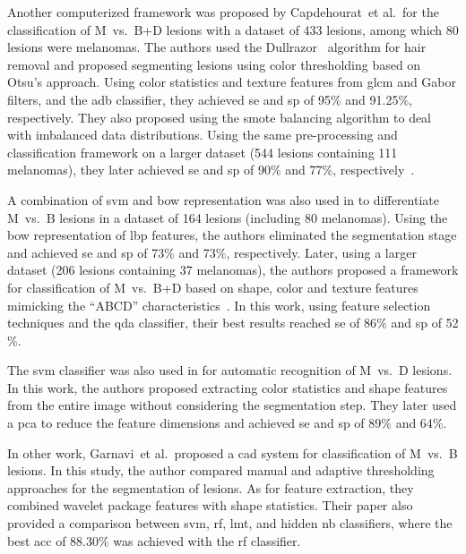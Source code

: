 Another computerized framework was proposed by Capdehourat~et al.\,\cite{capdehourat2009pigmented} for the classification of M~vs.~B+D lesions with a dataset of 433 lesions, among which 80 lesions were melanomas.
The authors used the Dullrazor\textsuperscript{\textregistered}~\cite{Lee1997} algorithm for hair removal and proposed segmenting lesions using color thresholding based on Otsu's approach.
Using color statistics and texture features from \ac{glcm} and Gabor filters, and the \ac{adb} classifier, they achieved \ac{se} and \ac{sp} of 95$\%$ and 91.25$\%$, respectively.
They also proposed using the \ac{smote} balancing algorithm to deal with imbalanced data distributions.
Using the same pre-processing and classification framework on a larger dataset (544 lesions containing 111 melanomas), they later achieved \ac{se} and \ac{sp} of 90$\%$ and 77$\%$, respectively~\cite{capdehourat2011toward}. 

A combination of \ac{svm} and \ac{bow} representation was also used in \cite{zortea2010automatic} to differentiate M~vs.~B lesions in a dataset of 164 lesions (including 80 melanomas).
Using the \ac{bow} representation of \ac{lbp} features, the authors eliminated the segmentation stage and achieved \ac{se} and \ac{sp} of 73$\%$ and 73$\%$, respectively.
Later, using a larger dataset (206 lesions containing 37 melanomas), the authors proposed a framework for classification of M~vs.~B+D based on shape, color and texture features mimicking the ``ABCD'' characteristics~\cite{zortea2014performance}.
In this work, using feature selection techniques and the \acf{qda} classifier, their best results reached \ac{se} of 86$\%$ and \ac{sp} of 52$\%$. 

The \acl{svm} classifier was also used in \cite{gilmore2010support} for automatic recognition of M~vs.~D lesions.
In this work, the authors proposed extracting color statistics and shape features from the entire image without considering the segmentation step.
They later used a \ac{pca} to reduce the feature dimensions and achieved \ac{se} and \ac{sp} of 89$\%$ and 64$\%$.

In other work, Garnavi~et al.\,\cite{garnavi2012computer} proposed a \ac{cad} system for classification of M~vs.~B lesions.
In this study, the author compared manual and adaptive thresholding approaches for the segmentation of lesions.
As for feature extraction, they combined wavelet package features with shape statistics.
Their paper also provided a comparison between \ac{svm}, \ac{rf}, \ac{lmt}, and hidden \ac{nb} classifiers, where the best \ac{acc} of 88.30$\%$ was achieved with the \ac{rf} classifier.


